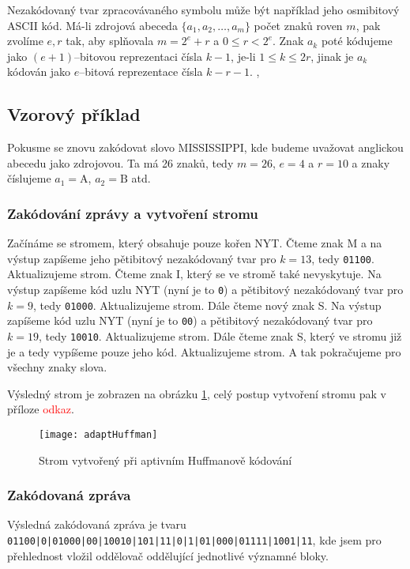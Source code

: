 Nezakódovaný tvar zpracovávaného symbolu může být například jeho osmibitový ASCII kód. Má-li zdrojová abeceda $\{a_1, a_2, \ldots, a_m\}$ počet znaků roven $m$, pak zvolíme $e,r$ tak, aby splňovala $m= 2^e + r$ a $0 \leq r < 2^e$. Znak $a_k$ poté kódujeme jako $(e+1)$--bitovou reprezentaci čísla $k-1$, je-li $1 \leq k \leq 2r$, jinak je $a_k$ kódován jako $e$--bitová reprezentace čísla $k-r-1$. \cite{dataCompression}, \cite{introductionToDataCompression}

\subsection{Vzorový příklad}
Pokusme se znovu zakódovat slovo MISSISSIPPI, kde budeme uvažovat anglickou abecedu jako zdrojovou. Ta má 26 znaků, tedy $m=26$, $e = 4$ a $r=10$ a znaky číslujeme $a_1 = \mathrm{A}$, $a_2 = \mathrm{B}$ atd.

\subsubsection{Zakódování zprávy a vytvoření stromu}
Začínáme se stromem, který obsahuje pouze kořen NYT. Čteme znak M a na výstup zapíšeme jeho pětibitový nezakódovaný tvar pro $k=13$, tedy \texttt{01100}. Aktualizujeme strom. Čteme znak I, který se ve stromě také nevyskytuje. Na výstup zapíšeme kód uzlu NYT (nyní je to \texttt{0}) a pětibitový nezakódovaný tvar pro $k=9$, tedy \texttt{01000}. Aktualizujeme strom. Dále čteme nový znak S. Na výstup zapíšeme kód uzlu NYT (nyní je to \texttt{00}) a pětibitový nezakódovaný tvar pro $k=19$, tedy \texttt{10010}. Aktualizujeme strom. Dále čteme znak S, který ve stromu již je a tedy vypíšeme pouze jeho kód. Aktualizujeme strom. A tak pokračujeme pro všechny znaky slova.

Výsledný strom je zobrazen na obrázku \ref{adaptivniHuffmanStrom}, celý postup vytvoření stromu pak v příloze \textcolor{red}{odkaz}.

\begin{figure}[!htb]
\centering
\texttt{[image: adaptHuffman]}
\caption{Strom vytvořený při aptivním Huffmanově kódování}
\label{adaptivniHuffmanStrom}
\end{figure}

\subsubsection{Zakódovaná zpráva}
Výsledná zakódovaná zpráva je tvaru \texttt{01100|0|01000|00|10010|101|11|0|1|01|000|01111|1001|11}, kde jsem pro přehlednost vložil oddělovač \uv{\texttt{|}} oddělující jednotlivé významné bloky.

